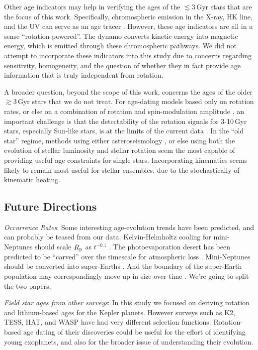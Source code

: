 \documentclass[11pt,twocolumn,tighten]{aastex63}
\begin{document}
Other age indicators may help in verifying the ages of
the $\lesssim$3\,Gyr stars that are the focus of this work.
Specifically, chromospheric emission in the
X-ray,  HK line, and the UV can serve as an age tracer
\citep{Mamajek_2008,2014MNRAS.441.2361V,2024ApJ...960...62E}.
However, these age indicators are all in a sense ``rotation-powered''.  The dynamo
converts kinetic energy into magnetic energy, which is emitted through these chromospheric
pathways.
We did not attempt to incorporate these indicators into this study
due to concerns regarding sensitivity, homogeneity, and
the question of whether they in fact provide age
information that is truly independent from rotation.

A broader question, beyond the scope of this work, concerns the ages of
the older $\gtrsim$3\,Gyr stars that we do not treat.
For age-dating models based only on rotation rates, or else
on a combination of rotation and spin-modulation amplitude
\citep{2023ApJ...952..131M}, an important challenge is that the detectability
of the rotation signals for 3-10\,Gyr stars, especially Sun-like stars,
is at the limits of the current data \citep{2022ApJ...937...94M}.
In the ``old star'' regime, methods 
using either asteroseismology
\citep{vanSaders_2016,2024ApJ...962..138S}, or else
using both the evolution of
stellar luminosity and stellar rotation \citep{Angus_2019} seem the most
capable of providing useful age constraints for single stars.
Incorporating kinematics \citep{2021AJ....161..189L} seems likely to remain
most useful for stellar ensembles, due to the stochastically of kinematic heating.


\subsection{Future Directions}
{\it Occurrence Rates}: Some interesting
age-evolution trends have been predicted, and can probably be teased
from our data.  
Kelvin-Helmholtz cooling for mini-Neptunes should scale $R_{\rm p}$ as
$t^{-0.1}$ \citep{Gupta_2019}.
The photoevaporation desert has been predicted to be ``carved'' over the timescale
for atmospheric loss \citep{Owen_Lai_2018}.
Mini-Neptunes should be converted into super-Earths \citep{Rogers_2021}.
And the boundary of the super-Earth population may correspondingly move up in size over
time \citep{David_2021}.
We're going to split the two papers.

{\it Field star ages from other surveys}:
In this study we focused on deriving rotation and lithium-based ages for the Kepler
planets.  However surveys such as K2, TESS, HAT, and WASP have had very different selection functions.
Rotation-based age dating of their discoveries could be useful for the effort
of identifying young exoplanets, and also for the broader issue of understanding
their evolution.
\end{document}
